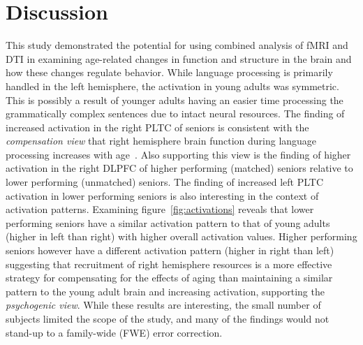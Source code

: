 \section{Discussion}
This study demonstrated the potential for using combined analysis of fMRI and DTI in examining age-related changes in function and structure in the brain and how these changes regulate behavior. While language processing is primarily handled in the left hemisphere, the activation in young adults was symmetric. This is possibly a result of younger adults having an easier time processing the grammatically complex sentences due to intact neural resources. The finding of increased activation in the right PLTC of seniors is consistent with the \emph{compensation view} that right hemisphere brain function during language processing increases with age~\cite{Cabeza2002}. Also supporting this view is the finding of higher activation in the right DLPFC of higher performing (matched) seniors relative to lower performing (unmatched) seniors. The finding of increased left PLTC activation in lower performing seniors is also interesting in the context of activation patterns. Examining figure~\ref{fig:activations} reveals that lower performing seniors have a similar activation pattern to that of young adults (higher in left than right) with higher overall activation values. Higher performing seniors however have a different activation pattern (higher in right than left) suggesting that recruitment of right hemisphere resources is a more effective strategy for compensating for the effects of aging than maintaining a similar pattern to the young adult brain and increasing activation, supporting the \emph{psychogenic view}. While these results are interesting, the small number of subjects limited the scope of the study, and many of the findings would not stand-up to a family-wide (FWE) error correction. 

